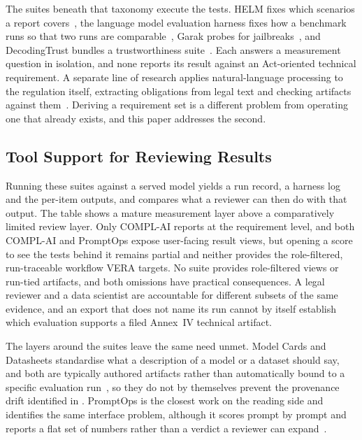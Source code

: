 \documentclass[10pt,conference,a4paper]{IEEEtran}
\begin{document}
The suites beneath that taxonomy execute the tests.
HELM fixes which scenarios a report covers~\cite{liang2023helm}, the language model evaluation harness fixes how a benchmark runs so that two runs are comparable~\cite{gao2021lmevalharness}, Garak probes for jailbreaks~\cite{derczynski2024garak}, and DecodingTrust bundles a trustworthiness suite~\cite{wang2023decodingtrust}.
Each answers a measurement question in isolation, and none reports its result against an Act-oriented technical requirement.
A separate line of research applies natural-language processing to the regulation itself, extracting obligations from legal text and checking artifacts against them~\cite{abualhaija2025llmregextraction,amaral2022nlpcompliance,abualhaija2024regchange}.
Deriving a requirement set is a different problem from operating one that already exists, and this paper addresses the second.

\subsection{Tool Support for Reviewing Results}
Running these suites against a served model yields a run record, a harness log and the per-item outputs, and  compares what a reviewer can then do with that output.
The table shows a mature measurement layer above a comparatively limited review layer.
Only COMPL-AI reports at the requirement level, and both COMPL-AI and PromptOps expose user-facing result views, but opening a score to see the tests behind it remains partial and neither provides the role-filtered, run-traceable workflow VERA targets.
No suite provides role-filtered views or run-tied artifacts, and both omissions have practical consequences.
A legal reviewer and a data scientist are accountable for different subsets of the same evidence, and an export that does not name its run cannot by itself establish which evaluation supports a filed Annex~IV technical artifact.

The layers around the suites leave the same need unmet.
Model Cards and Datasheets standardise what a description of a model or a dataset should say, and both are typically authored artifacts rather than automatically bound to a specific evaluation run~\cite{mitchell2019modelcard,gebru2021datasheets}, so they do not by themselves prevent the provenance drift identified in .
PromptOps is the closest work on the reading side and identifies the same interface problem, although it scores prompt by prompt and reports a flat set of numbers rather than a verdict a reviewer can expand~\cite{sunetnanta2025promptops}.
\end{document}
